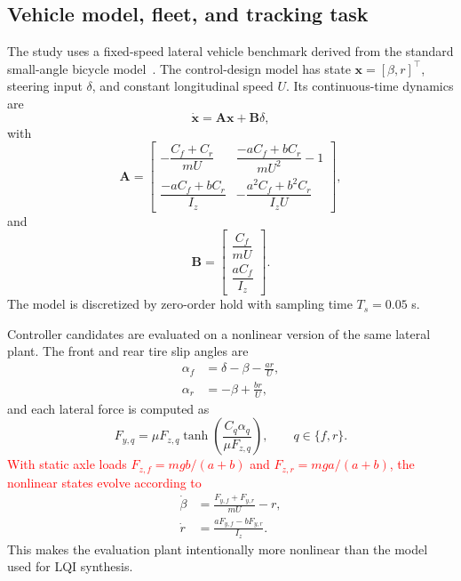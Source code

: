 \documentclass[conference]{IEEEtran}
\newcommand{\rev}[1]{\textcolor{red}{#1}}
\begin{document}
\subsection{Vehicle model, fleet, and tracking task}
\label{subsec:vehicle_task}
The study uses a fixed-speed lateral vehicle benchmark derived from the standard small-angle bicycle model~\cite{weber2026ifac}. The control-design model has state $\mathbf{x}=[\beta,r]^\top$, steering input $\delta$, and constant longitudinal speed $U$. Its continuous-time dynamics are
\begin{equation}
 \dot{\mathbf{x}}=\mathbf{A}\mathbf{x}+\mathbf{B}\delta,
 \label{eq:bicycle_ct}
\end{equation}
with
\begin{equation}
\mathbf{A}=\begin{bmatrix}
-\dfrac{C_f+C_r}{mU} & \dfrac{-aC_f+bC_r}{mU^2}-1\\[2mm]
\dfrac{-aC_f+bC_r}{I_z} & -\dfrac{a^2C_f+b^2C_r}{I_zU}
\end{bmatrix},
\label{eq:bicycle_A}
\end{equation}
and
\begin{equation}
\mathbf{B}=\begin{bmatrix}\dfrac{C_f}{mU}\\[2mm]\dfrac{aC_f}{I_z}\end{bmatrix}.
\label{eq:bicycle_B}
\end{equation}
The model is discretized by zero-order hold with sampling time $T_s=0.05$ s.

Controller candidates are evaluated on a nonlinear version of the same lateral plant. The front and rear tire slip angles are
\begin{align}
 \alpha_f&=\delta-\beta-\frac{ar}{U},\\
 \alpha_r&=-\beta+\frac{br}{U},
 \label{eq:slip_angles}
\end{align}
and each lateral force is computed as
\begin{equation}
 F_{y,q}=\mu F_{z,q}\tanh\left(\frac{C_q\alpha_q}{\mu F_{z,q}}\right),\qquad q\in\{f,r\}.
 \label{eq:tire_nonlinearity}
\end{equation}
\rev{With static axle loads $F_{z,f}=mgb/(a+b)$ and $F_{z,r}=mga/(a+b)$, the nonlinear states evolve according to}
\begin{align}
 \dot\beta&=\frac{F_{y,f}+F_{y,r}}{mU}-r,\\
 \dot r&=\frac{aF_{y,f}-bF_{y,r}}{I_z}.
 \label{eq:nonlinear_vehicle}
\end{align}
This makes the evaluation plant intentionally more nonlinear than the model used for LQI synthesis.
\end{document}

